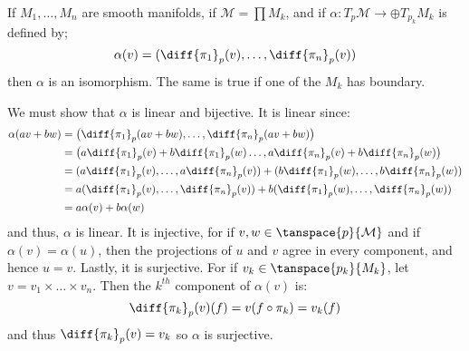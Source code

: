 \documentclass{article}                                                        %
\begin{document}
            \begin{problem}
                If $M_{1},\dots,M_{n}$ are smooth manifolds, if
                $\mathcal{M}=\prod{M}_{k}$, and if
                $\alpha:T_{p}\mathcal{M}\rightarrow\oplus{T}_{p_{k}}M_{k}$
                is defined by;
                \begin{equation}
                    \alpha(v)=(\diff{\pi_{1}}_{p}(v),\dots,
                                \diff{\pi_{n}}_{p}(v))
                \end{equation}
                then $\alpha$ is an isomorphism. The same is true if one of the
                $M_{k}$ has boundary.
            \end{problem}
            \begin{solution}
                We must show that $\alpha$ is linear and bijective. It is linear
                since:
                \begin{align}
                    \alpha(av+bw)&=
                        \big(\diff{\pi_{1}}_{p}(av+bw),\dots,
                            \diff{\pi_{n}}_{p}(av+bw)\big)\\
                        &=\big(a\diff{\pi_{1}}_{p}(v)+b\diff{\pi_{1}}_{p}(w)
                            \dots,a\diff{\pi_{n}}_{p}(v)+b\diff{\pi_{n}}_{p}(w)
                        \big)\\
                        &=(a\diff{\pi_{1}}_{p}(v),\dots,a\diff{\pi_{n}}_{p}(v))
                        +(b\diff{\pi_{1}}_{p}(w),\dots,b\diff{\pi_{n}}_{p}(w))\\
                        &=a(\diff{\pi_{1}}_{p}(v),\dots,\diff{\pi_{n}}_{p}(v))+
                        b(\diff{\pi_{1}}_{p}(w),\dots,\diff{\pi_{n}}_{p}(w))\\
                        &=a\alpha(v)+b\alpha(w)
                \end{align}
                and thus, $\alpha$ is linear. It is injective, for if
                $v,w\in\tanspace{p}{\mathcal{M}}$ and if $\alpha(v)=\alpha(u)$,
                then the projections of $u$ and $v$ agree in every component,
                and hence $u=v$. Lastly, it is surjective. For if
                $v_{k}\in\tanspace{p_{k}}{M_{k}}$, let
                $v=v_{1}\times\dots\times{v}_{n}$. Then the $k^{th}$ component
                of $\alpha(v)$ is:
                \begin{equation}
                    \diff{\pi_{k}}_{p}(v)(f)=v(f\circ\pi_{k})=v_{k}(f)
                \end{equation}
                and thus $\diff{\pi_{k}}_{p}(v)=v_{k}$ so $\alpha$ is
                surjective.
            \end{solution}
\end{document}
